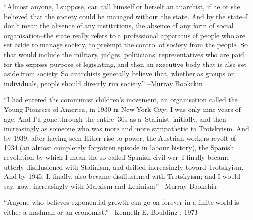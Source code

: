 \documentclass{article}%
\begin{document}
\linebreak%
\vspace{1mm}%
\begin{minipage}{\textwidth}%
\flushleft%
“Almost anyone, I suppose, can call himself or herself an anarchist, if he or she believed that the society could be managed without the state. And by the state–I don't mean the absence of any institutions, the absence of any form of social organisation–the state really refers to a professional apparatus of people who are set aside to manage society, to preëmpt the control of society from the people. So that would include the military, judges, politicians, representatives who are paid for the express purpose of legislating, and then an executive body that is also set aside from society. So anarchists generally believe that, whether as groups or individuals, people should directly run society.”%
\linebreak%
\vspace{1mm}%
–Murray Bookchin%
\linebreak%
\vspace{1mm}%
\end{minipage}%
\linebreak%
\vspace{1mm}%
\begin{minipage}{\textwidth}%
\flushleft%
“I had entered the communist children's movement, an organisation called the Young Pioneers of America, in 1930 in New York City; I was only nine years of age. And I'd gone through the entire '30s as a–Stalinist–initially, and then increasingly as someone who was more and more sympathetic to Trotskyism. And by 1939, after having seen Hitler rise to power, the Austrian workers revolt of 1934 (an almost completely forgotten episode in labour history), the Spanish revolution by which I mean the so{-}called Spanish civil war–I finally became utterly disillusioned with Stalinism, and drifted increasingly toward Trotskyism. And by 1945, I, finally, also became disillusioned with Trotskyism; and I would say, now, increasingly with Marxism and Leninism.”%
\linebreak%
\vspace{1mm}%
–Murray Bookchin%
\linebreak%
\vspace{1mm}%
\end{minipage}%
\linebreak%
\vspace{1mm}%
\begin{minipage}{\textwidth}%
\flushleft%
“Anyone who believes exponential growth can go on forever in a finite world is either a madman or an economist.”%
\linebreak%
\vspace{1mm}%
–Kenneth E. Boulding%
, 1973%
\linebreak%
\vspace{1mm}%
\end{minipage}%
\end{document}
